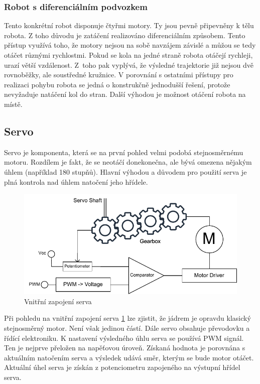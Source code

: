 \subsubsection{Robot s diferenciálním podvozkem}
Tento konkrétní robot disponuje čtyřmi motory. Ty jsou pevně připevněny k tělu robota. Z toho důvodu je zatáčení realizováno diferenciálním způsobem. Tento přístup využívá toho, že motory nejsou na sobě navzájem závislé a můžou se tedy otáčet různými rychlostmi. Pokud se kola na jedné straně robota otáčejí rychleji, urazí větší vzdálenost. Z~toho pak vyplývá, že výsledné trajektorie již nejsou dvě rovnoběžky, ale soustředné kružnice. V porovnání s ostatními přístupy pro realizaci pohybu robota se jedná o konstrukčně jednodušší řešení, protože nevyžaduje natáčení kol do stran. Další výhodou je možnost otáčení robota na místě. \cite[str:~5]{embeded_robotics}

\subsection*{Servo}
Servo je komponenta, která se na první pohled velmi podobá stejnosměrnému motoru. Rozdílem je fakt, že se neotáčí donekonečna, ale bývá omezena nějakým úhlem (například 180 stupňů). Hlavní výhodou a důvodem pro použití serva je plná kontrola nad úhlem natočení jeho hřídele.\cite[str:~119-121]{embeded_robotics}

\begin{figure}[h!]
	\centering
	\includegraphics[scale=0.9]{obrazky-figures/servo.pdf}
	\caption{Vnitřní zapojení serva}
	\label{fig:servo}
\end{figure}

Při pohledu na vnitřní zapojení serva \ref{fig:servo} lze zjistit, že jádrem je opravdu klasický stejnosměrný motor. Není však jedinou částí. Dále servo obsahuje převodovku a řídící elektroniku. K nastavení výsledného úhlu serva se používá PWM signál. Ten je nejprve přeložen na napěťovou úroveň. Získaná hodnota je porovnána s aktuálním natočením serva a výsledek udává směr, kterým se bude motor otáčet. Aktuální úhel serva je získán z potenciometru zapojeného na výstupní hřídel serva. \cite[str:~89-90]{mobilní_roboty}

